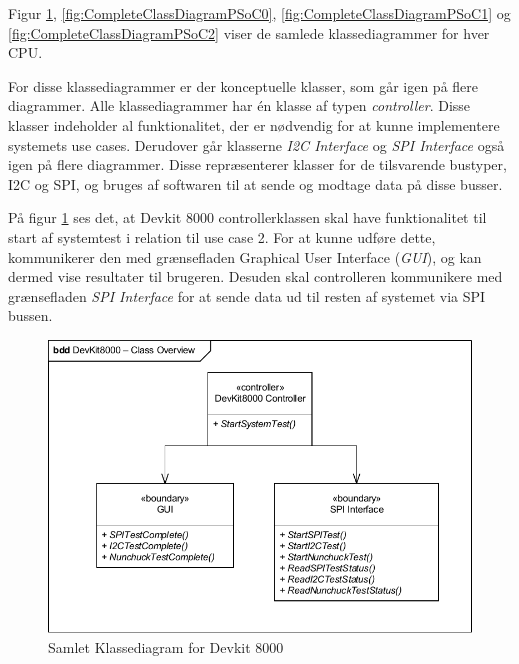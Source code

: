 \noindent Figur \ref{fig:CompleteClassDiagramDevKit8000}, \ref{fig:CompleteClassDiagramPSoC0}, \ref{fig:CompleteClassDiagramPSoC1} og \ref{fig:CompleteClassDiagramPSoC2} viser de samlede klassediagrammer for hver CPU.\newline

\noindent For disse klassediagrammer er der konceptuelle klasser, som går igen på flere diagrammer. Alle klassediagrammer har én klasse af typen \textit{controller}. Disse klasser indeholder al funktionalitet, der er nødvendig for at kunne implementere systemets use cases. Derudover går klasserne \textit{I2C Interface} og \textit{SPI Interface} også igen på flere diagrammer. Disse repræsenterer klasser for de tilsvarende bustyper, I2C og SPI, og bruges af softwaren til at sende og modtage data på disse busser.\newline

\noindent På figur \ref{fig:CompleteClassDiagramDevKit8000} ses det, at Devkit 8000 controllerklassen skal have funktionalitet til start af systemtest i relation til use case 2. For at kunne udføre dette, kommunikerer den med grænsefladen Graphical User Interface (\textit{GUI}), og kan dermed vise resultater til brugeren. Desuden skal controlleren kommunikere med grænsefladen \textit{SPI Interface} for at sende data ud til resten af systemet via SPI bussen.

\begin{figure}[H]
	\centering
	\includegraphics[width=\textwidth] {Systemarkitektur/images/CompleteClassDiagramDevKit8000}
	\caption{Samlet Klassediagram for Devkit 8000}
	\label{fig:CompleteClassDiagramDevKit8000}
\end{figure}


